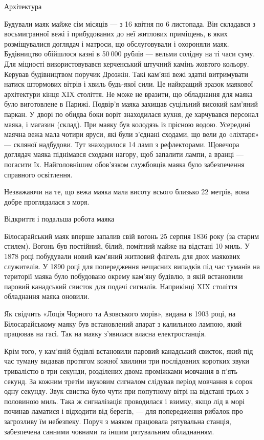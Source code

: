 Архітектура

Будували маяк майже сім місяців — з 16 квітня по 6 листопада. Він складався з
восьмигранної вежі і прибудованих до неї житлових приміщень, в яких
розміщувалися доглядач і матроси, що обслуговували і охороняли маяк.
Будівництво обійшлося казні в 50 000 рублів — вельми солідну на ті часи суму.
Для міцності використовувався керченський штучний камінь жовтого кольору.
Керував будівництвом поручик Дрозжін. Такі кам’яні вежі здатні витримувати
натиск штормових вітрів і хвиль будь-якої сили. Це найкращий зразок маякової
архітектури кінця XIX століття. Не може не вразити, що обладнання для маяка
було виготовлене в Парижі. Подвір'я маяка захищав суцільний високий кам’яний
паркан. У дворі по обидва боки воріт знаходилася кухня, де харчувався персонал
маяка, і магазин (склад). При маяку був колодязь із прісною водою. Усередині
маячна вежа мала чотири яруси, які були з'єднані сходами, що вели до «ліхтаря»
— скляної надбудови. Тут знаходилося 14 ламп з рефлекторами. Щовечора доглядач
маяка піднімався сходами нагору, щоб запалити лампи, а вранці — погасити їх.
Найголовнішим обов’язком службовців маяка було забезпечення справного
освітлення.

Незважаючи на те, що вежа маяка мала висоту всього близько 22 метрів, вона
добре проглядалася з моря.

Відкриття і подальша робота маяка

Білосарайський маяк вперше запалив свій вогонь 25 серпня 1836 року (за старим
стилем). Вогонь був постійний, білий, помітний майже на відстані 10 миль. У
1878 році побудували новий кам'яний житловий флігель для двох маякових
служителів. У 1890 році для попередження нещасних випадків під час туманів на
території маяка було побудовано окрему кам'яну будівлю, в якій встановили
паровий канадський свисток для подачі сигналів. Наприкінці XIX століття
обладнання маяка оновили.

Як свідчить «Лоція Чорного та Азовського морів», видана в 1903 році, на
Білосарайському маяку був встановлений апарат з калильною лампою, який працював
на гасі. Так на маяку з'явилася власна електростанція.

Крім того, у кам'яній будівлі встановили паровий канадський свисток, який під
час туману видавав протягом кожної хвилини три послідовних коротких звуки
тривалістю в три секунди, розділених двома проміжками мовчання в п'ять секунд.
За кожним третім звуковим сигналом слідував період мовчання в сорок одну
секунду. Звук свистка було чути при попутному вітрі на відстані трьох з
половиною миль. Така ж сигналізація проводилася і взимку, якщо лід в морі
починав ламатися і відходити від берегів, — для попередження рибалок про
загрозливу їм небезпеку. Поруч з маяком працювала рятувальна станція,
забезпечена санними човнами та іншим рятувальним обладнанням.

